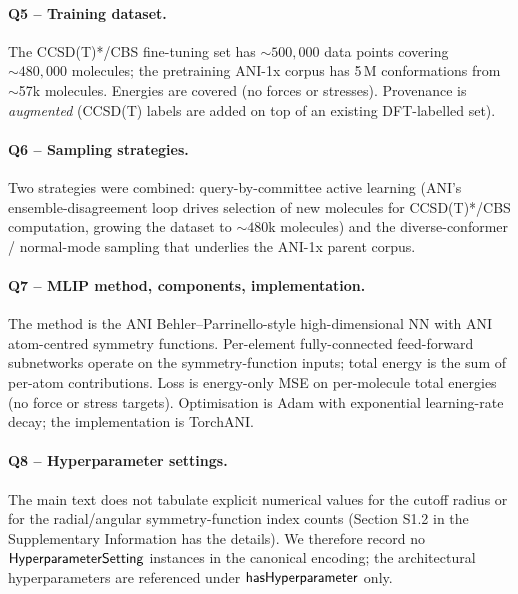 \paragraph{Q5 -- Training dataset.}
The CCSD(T)*/CBS fine-tuning set has ${\sim}500{,}000$ data points
covering ${\sim}480{,}000$ molecules; the pretraining ANI-1x corpus
has 5\,M conformations from $\sim$57k molecules. Energies are
covered (no forces or stresses). Provenance is \emph{augmented}
(CCSD(T) labels are added on top of an existing DFT-labelled set).


\paragraph{Q6 -- Sampling strategies.}
Two strategies were combined: query-by-committee active learning
(ANI's ensemble-disagreement loop drives selection of new molecules
for CCSD(T)*/CBS computation, growing the dataset to ${\sim}480$k
molecules) and the diverse-conformer / normal-mode sampling that
underlies the ANI-1x parent corpus.


\paragraph{Q7 -- MLIP method, components, implementation.}
The method is the ANI Behler--Parrinello-style high-dimensional NN
with ANI atom-centred symmetry functions. Per-element
fully-connected feed-forward subnetworks operate on the
symmetry-function inputs; total energy is the sum of per-atom
contributions. Loss is energy-only MSE on per-molecule total energies
(no force or stress targets). Optimisation is Adam with exponential
learning-rate decay; the implementation is TorchANI.


\paragraph{Q8 -- Hyperparameter settings.}
The main text does not tabulate explicit numerical values for the
cutoff radius or for the radial/angular symmetry-function index
counts (Section S1.2 in the Supplementary Information has the
details). We therefore record no $\mathsf{HyperparameterSetting}$ instances
in the canonical encoding; the architectural hyperparameters are
referenced under $\mathsf{hasHyperparameter}$ only.



